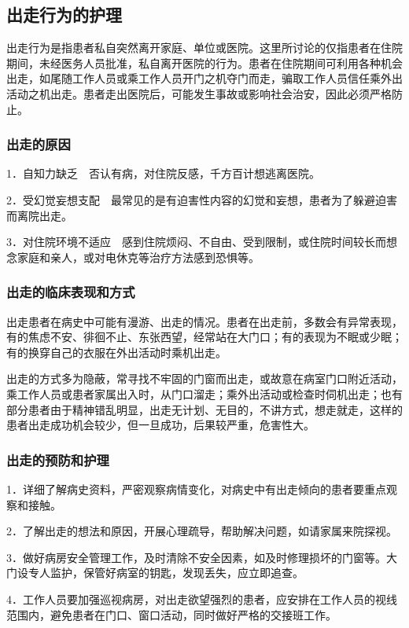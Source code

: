 \subsection{出走行为的护理}

出走行为是指患者私自突然离开家庭、单位或医院。这里所讨论的仅指患者在住院期间，未经医务人员批准，私自离开医院的行为。患者在住院期间可利用各种机会出走，如尾随工作人员或乘工作人员开门之机夺门而走，骗取工作人员信任乘外出活动之机出走。患者走出医院后，可能发生事故或影响社会治安，因此必须严格防止。

\subsubsection{出走的原因}

1．自知力缺乏　否认有病，对住院反感，千方百计想逃离医院。

2．受幻觉妄想支配　最常见的是有迫害性内容的幻觉和妄想，患者为了躲避迫害而离院出走。

3．对住院环境不适应　感到住院烦闷、不自由、受到限制，或住院时间较长而想念家庭和亲人，或对电休克等治疗方法感到恐惧等。

\subsubsection{出走的临床表现和方式}

出走患者在病史中可能有漫游、出走的情况。患者在出走前，多数会有异常表现，有的焦虑不安、徘徊不止、东张西望，经常站在大门口；有的表现为不眠或少眠；有的换穿自己的衣服在外出活动时乘机出走。

出走的方式多为隐蔽，常寻找不牢固的门窗而出走，或故意在病室门口附近活动，乘工作人员或患者家属出入时，从门口溜走；乘外出活动或检查时伺机出走；也有部分患者由于精神错乱明显，出走无计划、无目的，不讲方式，想走就走，这样的患者出走成功机会较少，但一旦成功，后果较严重，危害性大。

\subsubsection{出走的预防和护理}

1．详细了解病史资料，严密观察病情变化，对病史中有出走倾向的患者要重点观察和接触。

2．了解出走的想法和原因，开展心理疏导，帮助解决问题，如请家属来院探视。

3．做好病房安全管理工作，及时清除不安全因素，如及时修理损坏的门窗等。大门设专人监护，保管好病室的钥匙，发现丢失，应立即追查。

4．工作人员要加强巡视病房，对出走欲望强烈的患者，应安排在工作人员的视线范围内，避免患者在门口、窗口活动，同时做好严格的交接班工作。

